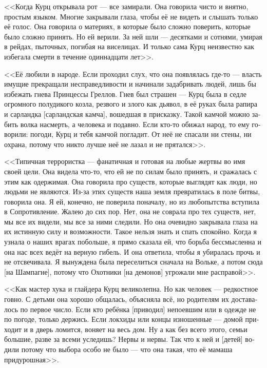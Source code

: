 \documentclass[a4paper,12pt,fleqn]{book}\usepackage{polyglossia}\setdefaultlanguage[babelshorthands=true]{russian}\setotherlanguage{english}\defaultfontfeatures{Ligatures=TeX,Mapping=tex-text}\usepackage{xcolor}\newcommand{\ml}[3]{#2}
\begin{document}
<<Когда Курц открывала рот --- все замирали.
Она говорила чисто и внятно, простым языком.
Многие закрывали глаза, чтобы её не видеть и слышать только её голос.
Она говорила о материях, в которые было сложно поверить, которые было сложно принять.
Но ей верили.
За ней шли --- десятками и сотнями, умирая в рейдах, пыточных, погибая на виселицах.
И только сама Курц неизвестно как избегала смерти в течение одиннадцати лет>>.

<<Её любили в народе.
Если проходил слух, что она появлялась где-то --- власть имущие прекращали несправедливости и начинали задабривать людей, лишь бы избежать гнева Принцессы Греллов.
Гнев был страшен --- Курц была в седле огромного полудикого козла, резвого и злого как дьявол, в её руках была рапира и сарландка [сарландская камча], вошедшая в присказку.
Такой камчой можно забить волка насмерть, а человека и подавно.
Если кто-то обижал народ, то ему говорили: погоди, Курц и тебя камчой погладит.
От неё не спасали ни стены, ни охрана, потому что никто лучше неё не лазал и не прятался>>.

<<Типичная террористка --- фанатичная и готовая на любые жертвы во имя своей цели.
Она видела что-то, что ей не по силам было принять, и сражалась с этим как одержимая.
Она говорила про существ, которые выглядят как люди, но людьми не являются.
Из-за этих существ наша земля превратилась в поле битвы, говорила она.
Я ей, конечно, не поверила поначалу, но из любопытства вступила в Сопротивление.
Жалею до сих пор.
Нет, она не соврала про тех существ, нет, мы все их видели, мы все за ними следили.
Но она очевидно закрывала глаза на их истинную силу и возможности.
Такое нельзя знать и спать спокойно.
Когда я узнала о наших врагах побольше, я прямо сказала ей, что борьба бессмысленна и она нас всех ведёт на верную гибель.
И она ответила, чтобы я убиралась прочь и не отсвечивала.
Я вынуждена была переселиться сначала на Вольке, а потом сюда [на Шампагне], потому что Охотники [на демонов] угрожали мне расправой>>.

<<Как мастер хука и глайдера Курц великолепна.
Но как человек --- редкостное говно.
С детьми она хорошо общалась, объясняла всё, но родителям их доставалось по первое число.
Если кто ребёнка [приводил] непоевшим или в одежде не по погоде, только держись.
Если локхиды или концы изношенные --- домой приходит и в дверь ломится, воняет на весь дом.
Ну а как без всего этого, семьи большие, разве за всеми уследишь?
Нервы и нервы.
Так что к ней и [детей] водили потому что выбора особо не было --- что она такая, что её мамаша придурошная>>.
\end{document}
